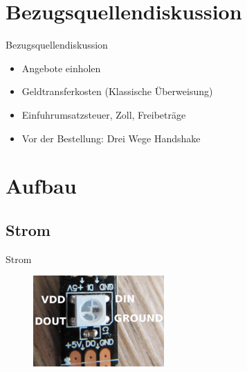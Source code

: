 \documentclass{beamer}
\begin{document}
\section{Bezugsquellendiskussion}
\begin{frame}{Bezugsquellendiskussion}
\begin{itemize}
 \item Angebote einholen
 \item Geldtransferkosten (Klassische Überweisung)
 \item Einfuhrumsatzsteuer, Zoll, Freibeträge
 \item Vor der Bestellung: Drei Wege Handshake
\end{itemize}
\end{frame}

\section{Aufbau}
\subsection{Strom}
\begin{frame}{Strom}
\begin{figure}[h]
 \centering
 \includegraphics[width=5cm,keepaspectratio=true]{./WS2812B_CloseUp.png}
\end{figure}

\begin{description}
\end{description}

\end{frame}
\end{document}
